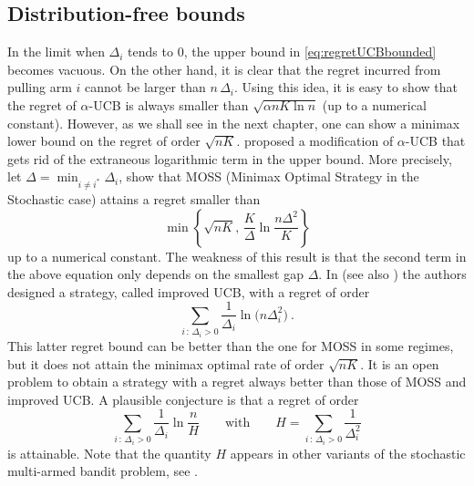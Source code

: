 \subsection{Distribution-free bounds}
In the limit when $\Delta_i$ tends to $0$, the upper bound in \eqref{eq:regretUCBbounded} becomes vacuous. On the other hand, it is clear that the regret incurred from pulling arm $i$ cannot be larger than $n\,\Delta_i$. Using this idea, it is easy to show that the regret of $\alpha$-UCB is always smaller than $\sqrt{\alpha n K \ln n}$ (up to a numerical constant). However, as we shall see in the next chapter, one can show a minimax lower bound on the regret of order $\sqrt{n K}$. \cite{AB09} proposed a modification of $\alpha$-UCB that gets rid of the extraneous logarithmic term in the upper bound. More precisely, let $\Delta = \min_{i \neq i^*} \Delta_i$, \cite{AB10} show that MOSS (Minimax Optimal Strategy in the Stochastic case) attains a regret smaller than 
$$\min \left\{ \sqrt{n K},\, \frac{K}{\Delta} \ln\frac{n \Delta^2}{K} \right\}$$
up to a numerical constant. The weakness of this result is that the second term in the above equation only depends on the smallest gap $\Delta$. In \cite{AO10} (see also \cite{PR11}) the authors designed a strategy, called improved UCB, with a regret of order
$$\sum_{i \,:\, \Delta_i > 0} \frac{1}{\Delta_i} \ln \bigl(n \Delta_i^2\bigr)~.$$
This latter regret bound can be better than the one for MOSS in some regimes, but it does not attain the minimax optimal rate of order $\sqrt{n K}$. It is an open problem to obtain a strategy with a regret always better than those of MOSS and improved UCB. A plausible conjecture is that a regret of order
\[
    \sum_{i \,:\, \Delta_i > 0} \frac{1}{\Delta_i} \ln \frac{n}{H}
\qquad\text{with}\qquad
    H = \sum_{i \,:\, \Delta_i > 0} \frac{1}{\Delta_i^2} 
\]
is attainable. Note that the quantity $H$ appears in other variants of the stochastic multi-armed bandit problem, see \cite{ABM10}.

